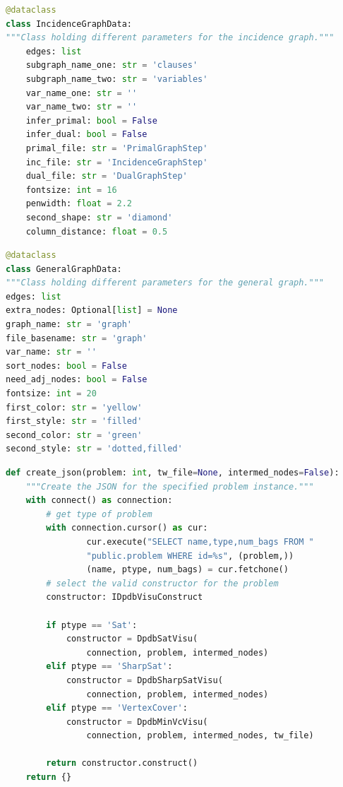 \documentclass[a4paper, 12pt, bibliography=totoc]{scrartcl}
\begin{document}
\begin{lstlisting}[language={Python}, caption={IncidenceGraphData}, label={lst:incidencedata}]
@dataclass
class IncidenceGraphData:
"""Class holding different parameters for the incidence graph."""
	edges: list
	subgraph_name_one: str = 'clauses'
	subgraph_name_two: str = 'variables'
	var_name_one: str = ''
	var_name_two: str = ''
	infer_primal: bool = False
	infer_dual: bool = False
	primal_file: str = 'PrimalGraphStep'
	inc_file: str = 'IncidenceGraphStep'
	dual_file: str = 'DualGraphStep'
	fontsize: int = 16
	penwidth: float = 2.2
	second_shape: str = 'diamond'
	column_distance: float = 0.5
\end{lstlisting}

\begin{lstlisting}[language={Python}, caption={GeneralGraphData}, label={lst:gengraphdata}]
@dataclass
class GeneralGraphData:
"""Class holding different parameters for the general graph."""
edges: list
extra_nodes: Optional[list] = None
graph_name: str = 'graph'
file_basename: str = 'graph'
var_name: str = ''
sort_nodes: bool = False
need_adj_nodes: bool = False
fontsize: int = 20
first_color: str = 'yellow'
first_style: str = 'filled'
second_color: str = 'green'
second_style: str = 'dotted,filled'
\end{lstlisting}

\begin{lstlisting}[language={Python}, caption={Construct\_dpdb\_visu.py}, label={lst:create-json}]
def create_json(problem: int, tw_file=None, intermed_nodes=False):
	"""Create the JSON for the specified problem instance."""
	with connect() as connection:
		# get type of problem
		with connection.cursor() as cur:
				cur.execute("SELECT name,type,num_bags FROM "
				"public.problem WHERE id=%s", (problem,))
				(name, ptype, num_bags) = cur.fetchone()	
		# select the valid constructor for the problem
		constructor: IDpdbVisuConstruct
		
		if ptype == 'Sat':
			constructor = DpdbSatVisu(
				connection, problem, intermed_nodes)
		elif ptype == 'SharpSat':
			constructor = DpdbSharpSatVisu(
				connection, problem, intermed_nodes)
		elif ptype == 'VertexCover':
			constructor = DpdbMinVcVisu(
				connection, problem, intermed_nodes, tw_file)
		
		return constructor.construct()
	return {} 
\end{lstlisting}
\end{document}
